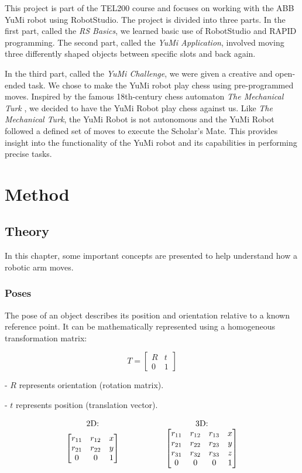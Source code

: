 \documentclass[a4paper,12pt]{article}
\begin{document}
This project is part of the TEL200 course and focuses on working with the ABB YuMi robot using RobotStudio. The project is divided into three parts. 
In the first part, called the \textit{RS Basics}, we learned basic use of RobotStudio and RAPID programming.
The second part, called the \textit{YuMi Application}, involved moving three differently shaped objects between specific slots and back again.

In the third part, called the \textit{YuMi Challenge}, we were given a creative and open-ended task. We chose to make the YuMi robot play chess using pre-programmed moves. Inspired by the famous 18th-century chess automaton \textit{The Mechanical Turk} \parencite{mechanicalturk2025}, we decided to have the YuMi Robot play chess against us. Like \textit{The Mechanical Turk}, the YuMi Robot is not autonomous and the YuMi Robot followed a defined set of moves to execute the Scholar's Mate. This provides insight into the functionality of the YuMi robot and its capabilities in performing precise tasks.
\section{Method}
\subsection{Theory}
In this chapter, some important concepts are presented to help understand how a robotic arm moves.

\subsubsection{Poses}
The pose of an object describes its position and orientation relative to a known reference point. It can be mathematically represented using a homogeneous transformation matrix:

\[
T = 
\begin{bmatrix}
R & t \\
0 & 1
\end{bmatrix}
\]

- \( R \) represents orientation (rotation matrix).

- \( t \) represents position (translation vector).

\[
\begin{array}{c@{\hspace{2cm}}c}
\text{2D:} &
\text{3D:} \\
\begin{bmatrix}
r_{11} & r_{12} & x \\
r_{21} & r_{22} & y \\
0 & 0 & 1
\end{bmatrix}
&
\begin{bmatrix}
r_{11} & r_{12} & r_{13} & x \\
r_{21} & r_{22} & r_{23} & y \\
r_{31} & r_{32} & r_{33} & z \\
0 & 0 & 0 & 1
\end{bmatrix}
\end{array}
\]
\end{document}
